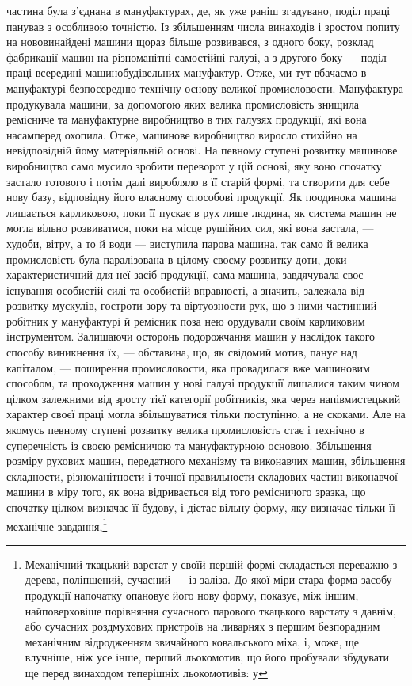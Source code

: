 частина була з’єднана в мануфактурах, де, як уже раніш згадувано,
поділ праці панував з особливою точністю. Із збільшенням числа
винаходів і зростом попиту на нововинайдені машини щораз
більше розвивався, з одного боку, розклад фабрикації машин на
різноманітні самостійні галузі, а з другого боку — поділ праці
всередині машинобудівельних мануфактур. Отже, ми тут вбачаємо
в мануфактурі безпосередню технічну основу великої промисловости.
Мануфактура продукувала машини, за допомогою яких
велика промисловість знищила ремісниче та мануфактурне виробництво
в тих галузях продукції, які вона насамперед охопила.
Отже, машинове виробництво виросло стихійно на невідповідній
йому матеріяльній основі. На певному ступені розвитку машинове
виробництво само мусило зробити переворот у цій основі, яку воно
спочатку застало готового і потім далі виробляло в її старій формі,
та створити для себе нову базу, відповідну його власному способові
продукції. Як поодинока машина лишається карликовою, поки
її пускає в рух лише людина, як система машин не могла вільно
розвиватися, поки на місце рушійних сил, які вона застала, —
худоби, вітру, а то й води — виступила парова машина, так само
й велика промисловість була паралізована в цілому своєму розвитку
доти, доки характеристичний для неї засіб продукції,
сама машина, завдячувала своє існування особистій силі та особистій
вправності, а значить, залежала від розвитку мускулів,
гостроти зору та віртуозности рук, що з ними частинний робітник
у мануфактурі й ремісник поза нею орудували своїм карликовим
інструментом. Залишаючи осторонь подорожчання машин у
наслідок такого способу виникнення їх, — обставина, що, як свідомий
мотив, панує над капіталом, — поширення промисловости,
яка провадилася вже машиновим способом, та проходження машин
у нові галузі продукції лишалися таким чином цілком залежними
від зросту тієї категорії робітників, яка через напівмистецький
характер своєї праці могла збільшуватися тільки поступінно,
а не скоками. Але на якомусь певному ступені розвитку велика
промисловість стає і технічно в суперечність із своєю ремісничою
та мануфактурною основою. Збільшення розміру рухових
машин, передатного механізму та виконавчих машин, збільшення
складности, різноманітности і точної правильности складових
частин виконавчої машини в міру того, як вона відривається від
того ремісничого зразка, що спочатку цілком визначає її будову, і
дістає вільну форму, яку визначає тільки її механічне завдання,\footnote{
Механічний ткацький варстат у своїй першій формі складається
переважно з дерева, поліпшений, сучасний — із заліза. До якої міри стара
форма засобу продукції напочатку опановує його нову форму, показує,
між іншим, найповерховіше порівняння сучасного парового ткацького
варстату з давнім, або сучасних роздмухових пристроїв на ливарнях
з першим безпорадним механічним відродженням звичайного ковальського
міха, і, може, ще влучніше, ніж усе інше, перший льокомотив, що його
пробували збудувати ще перед винаходом теперішніх льокомотивів: у
}